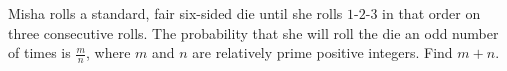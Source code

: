 Misha rolls a standard, fair six-sided die until she rolls $1$-$2$-$3$ in that order on three consecutive rolls. The probability that she will roll the die an odd number of times is $\tfrac{m}{n}$, where $m$ and $n$ are relatively prime positive integers. Find $m+n$.